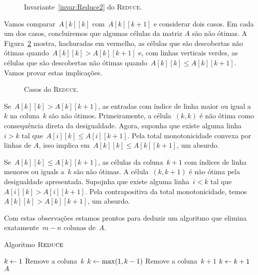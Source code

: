 \begin{figure}[h]
    \centering
    
    \caption{Invariante~\ref{invar:Reduce2} do \textsc{Reduce}.} \label{figure:Reduce1}
\end{figure}

Vamos comparar~$A[k][k]$ com~$A[k][k+1]$ e considerar dois casos. Em cada um dos casos, concluiremos que algumas células da matriz $A$ são não ótimas. A Figura~\ref{figure:Reduce2} mostra, hachuradas em vermelho, as células que são descobertas não ótimas quando~$A[k][k] > A[k][k+1]$ e, com linhas verticais verdes, as células que são descobertas não ótimas quando~$A[k][k] \leq A[k][k+1]$. Vamos provar estas implicações.

\begin{figure}[h]
    \centering
    
    \caption{Casos do \textsc{Reduce}.} \label{figure:Reduce2}
\end{figure}

Se~$A[k][k] > A[k][k+1]$, as entradas com índice de linha maior ou igual a~$k$ na coluna~$k$ são não ótimos. Primeiramente, a célula~$(k,k)$ é não ótima como consequência direta da desigualdade. Agora, suponha que existe alguma linha~$i>k$ tal que~$A[i][k] \leq A[i][k+1]$. Pela total monotonicidade convexa por linhas de $A$, isso implica em~$A[k][k] \leq A[k][k+1]$, um absurdo.  

Se~$A[k][k] \leq A[k][k+1]$, as células da coluna~$k+1$ com índices de linha menores ou iguals a~$k$ são não ótimas. A célula~$(k,k+1)$ é não ótima pela desigualdade apresentada. Supojnha que existe alguma linha~$i<k$ tal que~$A[i][k] > A[i][k+1]$. Pela contrapositiva da total monotonicidade, temos~$A[k][k] > A[k][k+1]$, um absurdo.  

Com estas observações estamos prontos para deduzir um algoritmo que elimina exatamente~$m-n$ colunas de~$A$. 

\newcommand{\Reduce}{\textsc{Reduce}}
\begin{algorithm}[H]
\caption{Algoritmo $\Reduce$}
\label{Reduce}
\begin{algorithmic}[1]
\Function{\Reduce}{A}
    \State $k \leftarrow 1$
            \State Remove a coluna~$k$
            \State $k \leftarrow \max(1,k-1)$
        \Else
                \State Remove a coluna~$k+1$
            \Else
                \State $k \leftarrow k+1$
            \EndIf
        \EndIf
    \EndWhile
    \State \Return $A$
\EndFunction
\end{algorithmic}
\end{algorithm}

